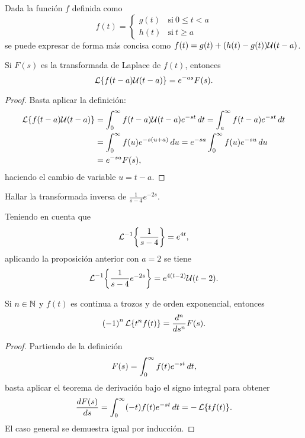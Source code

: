 \documentclass[../ecuaciones_diferenciales.tex]{subfiles}
\begin{document}
\begin{example}
	Dada la función \(f\) definida como
	\[f(t) =
		\begin{cases}
			g(t) & \mathrm{si}\ 0 \leq t < a \\
			h(t) & \mathrm{si}\ t \geq a
		\end{cases}
	\]
	se puede expresar de forma más concisa como
	\(f(t) = g(t) + (h(t)-g(t))\mathcal{U}(t-a)\).
\end{example}

\begin{proposition}
	Si \(F(s)\) es la transformada de Laplace de \(f(t)\), entonces
	\[\operatorname{\mathcal{L}}\{f(t-a)\mathcal{U}(t-a)\} = e^{-as}F(s).\]
	\begin{proof}
		Basta aplicar la definición:
		\begin{align*}
			\operatorname{\mathcal{L}}\{f(t-a)\mathcal{U}(t-a)\}
			 & = \int_0^\infty f(t-a)\mathcal{U}(t-a) e^{-st} \mathop{d\!} t
			= \int_a^\infty f(t-a)e^{-st} \mathop{d\!} t                     \\
			 & = \int_0^\infty f(u)e^{-s(u+a)} \mathop{d\!} u
			= e^{-sa} \int_0^\infty f(u) e^{-su} \mathop{d\!} u              \\
			 & = e^{-sa}F(s),
		\end{align*}
		haciendo el cambio de variable \(u = t - a\).
	\end{proof}
\end{proposition}

\begin{example}
	Hallar la transformada inversa de \(\frac{1}{s-4}e^{-2s}\).
\end{example}

\begin{solution}
	Teniendo en cuenta que
	\[\laplace^{-1}\left\{\frac{1}{s-4}\right\} = e^{4t},\]
	aplicando la proposición anterior con \(a=2\) se tiene
	\[\laplace^{-1}\left\{\frac{1}{s-4}e^{-2s}\right\} = e^{4(t-2)}\heavyside(t-2).\]
\end{solution}

\begin{theorem}
	Si \(n \in \mathbb{N}\) y \(f(t)\) es continua a trozos y de orden exponencial, entonces
	\[{(-1)}^n \laplacetrans{t^n f(t)} = \frac{\dif {}^n}{\dif s^n} F(s).\]
	\begin{proof}
		Partiendo de la definición
		\[F(s) = \int_0^\infty f(t)e^{-st} \mathop{d\!} t,\]
		basta aplicar el teorema de derivación bajo el signo integral para obtener
		\[\frac{\mathop{d\!} F(s)}{\mathop{d\!} s} = \int_0^\infty (-t)f(t)e^{-st} \mathop{d\!} t =
			-\operatorname{\mathcal{L}}\{tf(t)\}.\]
		El caso general se demuestra igual por inducción.
	\end{proof}
\end{theorem}
\end{document}
